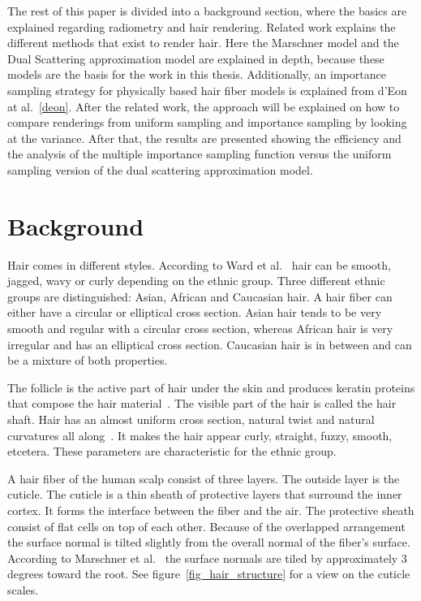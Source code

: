 \documentclass[11pt,a4paper]{report}
\begin{document}
The rest of this paper is divided into a background section, where the basics are explained regarding radiometry and hair rendering. Related work explains the different methods that exist to render hair. Here the Marschner model and the Dual Scattering approximation model are explained in depth, because these models are the basis for the work in this thesis. Additionally, an importance sampling strategy for physically based hair fiber models is explained from d'Eon at al.~\ref{deon}. After the related work, the approach will be explained on how to compare renderings from uniform sampling and importance sampling by looking at the variance. After that, the results are presented showing the efficiency and the analysis of the multiple importance sampling function versus the uniform sampling version of the dual scattering approximation model.

%
%

\chapter{Background}

Hair comes in different styles. According to Ward et al.~\cite{ward} hair can be smooth, jagged, wavy or curly depending on the ethnic group. Three different ethnic groups are distinguished: Asian, African and Caucasian hair. A hair fiber can either have a circular or elliptical cross section. Asian hair tends to be very smooth and regular with a circular cross section, whereas African hair is very irregular and has an elliptical cross section. Caucasian hair is in between and can be a mixture of both properties.

The follicle is the active part of hair under the skin and produces keratin proteins that compose the hair material~\cite{hadap}. The visible part of the hair is called the hair shaft. Hair has an almost uniform cross section, natural twist and natural curvatures all along~\cite{hadap}. It makes the hair appear curly, straight, fuzzy, smooth, etcetera. These parameters are characteristic for the ethnic group.

A hair fiber of the human scalp consist of three layers. The outside layer is the cuticle. The cuticle is a thin sheath of protective layers that surround the inner cortex. It forms the interface between the fiber and the air. The protective sheath consist of flat cells on top of each other. Because of the overlapped arrangement the surface normal is tilted slightly from the overall normal of the fiber's surface. According to Marschner et al.~\cite{marschner} the surface normals are tiled by approximately 3 degrees toward the root. See figure~\ref{fig_hair_structure} for a view on the cuticle scales.
\end{document}
